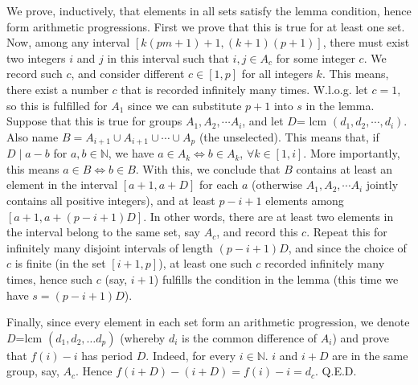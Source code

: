 \documentclass[11pt,a4paper]{article}
\begin{document}
\begin{enumerate}
We prove, inductively, that elements in all sets satisfy the lemma condition, hence form arithmetic progressions. First we prove that this is true for at least one set. Now, among any interval $[k(pm+1)+1, (k+1)(p+1)]$, there must exist two integers $i$ and $j$ in this interval such that $i,j\in A_c$ for some integer $c$. We record such $c$, and consider different $c\in[1,p]$ for all integers $k$. This means, there exist a number $c$ that is recorded infinitely many times. W.l.o.g. let $c=1$, so this is fulfilled for $A_1$ since we can substitute $p+1$ into $s$ in the lemma. Suppose that this is true for groups $A_1, A_2,\cdots A_i$, and let $D$= lcm $(d_1, d_2,\cdots , d_i)$. Also name $B=A_{i+1}\cup A_{i+1}\cup\cdots\cup A_{p}$ (the unselected). This means that, if $D\mid a-b$ for $a, b\in\mathbb{N}$, we have $a\in A_{k}\Leftrightarrow b\in A_{k}$, $\forall k\in [1,i]$. More importantly, this means $a\in B\Leftrightarrow b\in B$. With this, we conclude that $B$ contains at least an element in the interval $[a+1, a+D]$ for each $a$ (otherwise $A_1, A_2,\cdots A_i$ jointly contains all positive integers), and at least $p-i+1$ elements among $[a+1, a+(p-i+1)D]$. In other words, there are at least two elements in the interval belong to the same set, say $A_c$, and record this $c$. Repeat this for infinitely many disjoint intervals of length $(p-i+1)D$, and since the choice of $c$ is finite (in the set $[i+1, p]$), at least one such $c$ recorded infinitely many times, hence such $c$ (say, $i+1$) fulfills the condition in the lemma (this time we have $s=(p-i+1)D$).

Finally, since every element in each set form an arithmetic progression, we denote $D$=lcm $(d_1, d_2,\dots d_p)$ (whereby $d_i$ is the common difference of $A_i$) and prove that $f(i)-i$ has period $D$. Indeed, for every $i\in\mathbb{N}$. $i$ and $i+D$ are in the same group, say, $A_c$. Hence $f(i+D)-(i+D)=f(i)-i=d_c$. Q.E.D. 

\end{enumerate}
\end{document}
